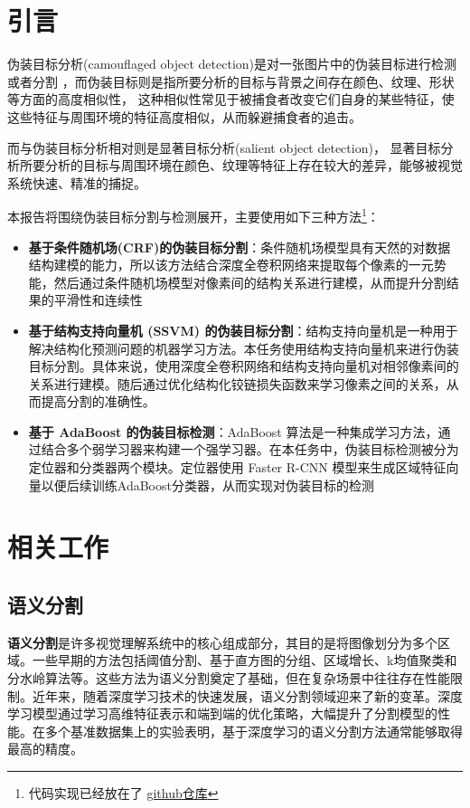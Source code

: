 \documentclass[a4paper,12pt]{ctexart}
\begin{document}
\tableofcontents

\newpage

\section{引言}

伪装目标分析(camouflaged object detection)是对一张图片中的伪装目标进行检测或者分割
，而伪装目标则是指所要分析的目标与背景之间存在颜色、纹理、形状等方面的高度相似性，
这种相似性常见于被捕食者改变它们自身的某些特征，使这些特征与周围环境的特征高度相似，从而躲避捕食者的追击。

而与伪装目标分析相对则是显著目标分析(salient object detection)，
显著目标分析所要分析的目标与周围环境在颜色、纹理等特征上存在较大的差异，能够被视觉系统快速、精准的捕捉。

本报告将围绕伪装目标分割与检测展开，主要使用如下三种方法\footnote{代码实现已经放在了 \href{https://github.com/ottozhao-void/Camouflaged_Object_Analysis}{github仓库}}：
\begin{itemize}
    \item \textbf{基于条件随机场(CRF)的伪装目标分割}：条件随机场模型具有天然的对数据结构建模的能力，所以该方法结合深度全卷积网络来提取每个像素的一元势能，然后通过条件随机场模型对像素间的结构关系进行建模，从而提升分割结果的平滑性和连续性
    \item \textbf{基于结构支持向量机 (SSVM) 的伪装目标分割}：结构支持向量机是一种用于解决结构化预测问题的机器学习方法。本任务使用结构支持向量机来进行伪装目标分割。具体来说，使用深度全卷积网络和结构支持向量机对相邻像素间的关系进行建模。随后通过优化结构化铰链损失函数来学习像素之间的关系，从而提高分割的准确性。
    \item \textbf{基于 AdaBoost 的伪装目标检测}：AdaBoost 算法是一种集成学习方法，通过结合多个弱学习器来构建一个强学习器。在本任务中，伪装目标检测被分为定位器和分类器两个模块。定位器使用 Faster R-CNN 模型来生成区域特征向量以便后续训练AdaBoost分类器，从而实现对伪装目标的检测
\end{itemize}

\section{相关工作}

\subsection{语义分割}
\textbf{语义分割}是许多视觉理解系统中的核心组成部分，其目的是将图像划分为多个区域。一些早期的方法包括阈值分割\cite{Otsu1979ATS}、基于直方图的分组、区域增长\cite{Nock2004StatisticalRM}、k均值聚类\cite{Dhanachandra2015ImageSU}和分水岭算法\cite{Najman1994WatershedOA}等。这些方法为语义分割奠定了基础，但在复杂场景中往往存在性能限制。近年来，随着深度学习技术的快速发展，语义分割领域迎来了新的变革。深度学习模型通过学习高维特征表示和端到端的优化策略，大幅提升了分割模型的性能。在多个基准数据集上的实验表明，基于深度学习的语义分割方法通常能够取得最高的精度。
\end{document}
